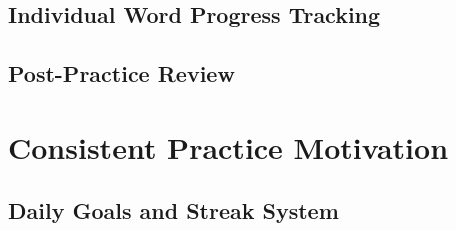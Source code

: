 \subsection{Individual Word Progress Tracking}

\subsection{Post-Practice Review}

\section{Consistent Practice Motivation}
\label{sec:em-gamification-practice-motivation}

\subsection{Daily Goals and Streak System}
